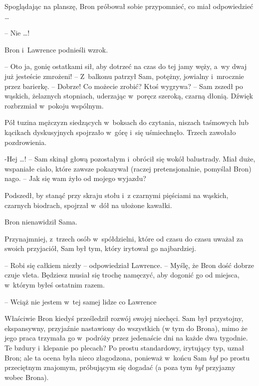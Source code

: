\documentclass[oneside,polish,11pt,rmheadings]{mwbk}
\begin{document}
Spoglądając na planszę, Bron próbował sobie przypomnieć, co miał odpowiedzieć \ldots  

-- Nie \ldots ! 

Bron i~Lawrence podnieśli wzrok. 

-- Oto ja, gonię ostatkami sił, aby dotrzeć na czas do tej jamy węży, a~wy dwaj już jesteście zmrożeni! -- Z~balkonu patrzył Sam, potężny, jowialny i~mrocznie przez barierkę.   -- Dobrze! Co możecie zrobić? Ktoś wygrywa? -- Sam zszedł po wąskich, żelaznych stopniach, uderzając w~poręcz szeroką, czarną dłonią. Dźwięk rozbrzmiał w~pokoju wspólnym. 

Pół tuzina mężczyzn siedzących w~boksach do czytania, niszach taśmowych lub kącikach dyskusyjnych spojrzało w~górę i~się uśmiechnęło. Trzech zawołało pozdrowienia. 

-Hej  \ldots  ! -- Sam skinął głową pozostałym i~obrócił się wokół balustrady. Miał duże, wspaniałe ciało, które zawsze pokazywał (raczej pretensjonalnie, pomyślał Bron) nago.  -- Jak się wam żyło od mojego wyjazdu? 

Podszedł, by stanąć przy skraju stołu i~z czarnymi pięściami na wąskich, czarnych biodrach, spojrzał w~dół na ułożone kawałki. 

Bron nienawidził Sama. 

Przynajmniej, z~trzech osób w~spółdzielni, które od czasu do czasu uważał za swoich przyjaciół, Sam był tym, który irytował go najbardziej. 

-- Robi się całkiem niezły -- odpowiedział Lawrence. -- Myślę, że Bron dość dobrze czuje vleta. Będziesz musiał się trochę namęczyć, aby dogonić go od miejsca, w~którym byłeś ostatnim razem. 

-- Wciąż nie jestem w~tej samej lidze co Lawrence 

Właściwie Bron kiedyś prześledził rozwój swojej niechęci. Sam był przystojny, ekspansywny, przyjaźnie nastawiony do wszystkich (w tym do Brona), mimo że jego praca trzymała go w~podróży przez jedenaście dni na każde dwa tygodnie. Te bzdury i~klepanie po plecach? Po prostu standardowy, irytujący typ, uznał Bron; ale ta ocena była nieco złagodzona, ponieważ w~końcu Sam \textit{był }po prostu przeciętnym znajomym, próbującym się dogadać (a poza tym \textit{był } przyjazny wobec Brona). 
\end{document}
